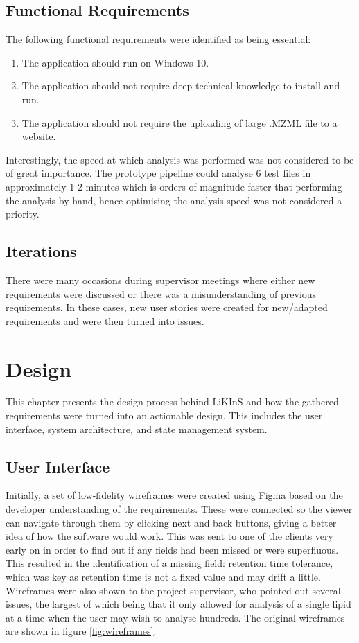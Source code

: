 \documentclass{l4proj}
\begin{document}
\section{Functional Requirements} \label{key-requirements}
The following functional requirements were identified as being essential:
\begin{enumerate}
    \item The application should run on Windows 10.
    \item The application should not require deep technical knowledge to install and run.
    \item The application should not require the uploading of large .MZML file to a website.
\end{enumerate}
Interestingly, the speed at which analysis was performed was not considered to be of great importance. The prototype pipeline could analyse 6 test files in approximately 1-2 minutes which is orders of magnitude faster that performing the analysis by hand, hence optimising the analysis speed was not considered a priority.

\section{Iterations}
There were many occasions during supervisor meetings where either new requirements were discussed or there was a misunderstanding of previous requirements. In these cases, new user stories were created for new/adapted requirements and were then turned into issues.


\chapter{Design}
This chapter presents the design process behind LiKInS and how the gathered requirements were turned into an actionable design. This includes the user interface, system architecture, and state management system.


\section{User Interface} \label{user-interface-design}
Initially, a set of low-fidelity wireframes were created using Figma based on the developer understanding of the requirements. These were connected so the viewer can navigate through them by clicking next and back buttons, giving a better idea of how the software would work. This was sent to one of the clients very early on in order to find out if any fields had been missed or were superfluous. This resulted in the identification of a missing field: retention time tolerance, which was key as retention time is not a fixed value and may drift a little. Wireframes were also shown to the project supervisor, who pointed out several issues, the largest of which being that it only allowed for analysis of a single lipid at a time when the user may wish to analyse hundreds. The original wireframes are shown in figure \ref{fig:wireframes}.
\end{document}
